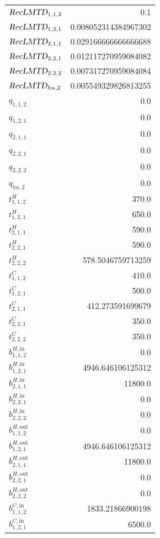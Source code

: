 \documentclass{article}%
\begin{document}
\begin{multicols*}{3}
\begin{supertabular}{lr}
	$\textsl{RecLMTD}_{1,1,2}$ & 0.1 \\%
	$\textsl{RecLMTD}_{1,2,1}$ & 0.008052314384967302 \\%
	$\textsl{RecLMTD}_{2,1,1}$ & 0.029166666666666688 \\%
	$\textsl{RecLMTD}_{2,2,1}$ & 0.012117270959084082 \\%
	$\textsl{RecLMTD}_{2,2,2}$ & 0.007317270959084084 \\%
	$\textsl{RecLMTD}_{hu,2}$ & 0.005549329826813255 \\%
	$q_{1,1,2}$ & 0.0 \\%
	$q_{1,2,1}$ & 0.0 \\%
	$q_{2,1,1}$ & 0.0 \\%
	$q_{2,2,1}$ & 0.0 \\%
	$q_{2,2,2}$ & 0.0 \\%
	$q_{hu,2}$ & 0.0 \\%
	$t_{1,1,2}^{H}$ & 370.0 \\%
	$t_{1,2,1}^{H}$ & 650.0 \\%
	$t_{2,1,1}^{H}$ & 590.0 \\%
	$t_{2,2,1}^{H}$ & 590.0 \\%
	$t_{2,2,2}^{H}$ & 578.5046759713259 \\%
	$t_{1,1,2}^{C}$ & 410.0 \\%
	$t_{1,2,1}^{C}$ & 500.0 \\%
	$t_{2,1,1}^{C}$ & 412.273591699679 \\%
	$t_{2,2,1}^{C}$ & 350.0 \\%
	$t_{2,2,2}^{C}$ & 350.0 \\%
	$b_{1,1,2}^{H,\text{in}}$ & 0.0 \\%
	$b_{1,2,1}^{H,\text{in}}$ & 4946.646106125312 \\%
	$b_{2,1,1}^{H,\text{in}}$ & 11800.0 \\%
	$b_{2,2,1}^{H,\text{in}}$ & 0.0 \\%
	$b_{2,2,2}^{H,\text{in}}$ & 0.0 \\%
	$b_{1,1,2}^{H,\text{out}}$ & 0.0 \\%
	$b_{1,2,1}^{H,\text{out}}$ & 4946.646106125312 \\%
	$b_{2,1,1}^{H,\text{out}}$ & 11800.0 \\%
	$b_{2,2,1}^{H,\text{out}}$ & 0.0 \\%
	$b_{2,2,2}^{H,\text{out}}$ & 0.0 \\%
	$b_{1,1,2}^{C,\text{in}}$ & 1833.21866900198 \\%
	$b_{1,2,1}^{C,\text{in}}$ & 6500.0 \\%

\end{supertabular}
\end{multicols*}
\end{document}
